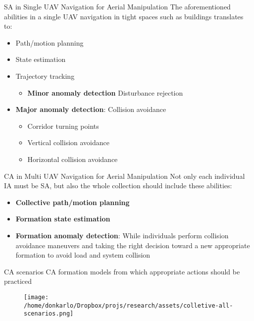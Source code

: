 \documentclass[unknownkeysallowed]{beamer}
\begin{document}
	\begin{frame}{SA in Single UAV Navigation for Aerial Manipulation}
		The aforementioned abilities in a single UAV navigation in tight spaces such as buildings translates to:
		\begin{itemize}
			\item Path/motion planning
			\item State estimation
			\item Trajectory tracking
				\begin{itemize}
					\item \textbf{Minor anomaly detection} Disturbance rejection
				\end{itemize}
			\item \textbf{Major anomaly detection}: Collision avoidance
				\begin{itemize}
					\item Corridor turning points
					\item Vertical collision avoidance
					\item Horizontal collision avoidance
				\end{itemize}
		\end{itemize}
	\end{frame}

	\begin{frame}{CA in Multi UAV Navigation for Aerial Manipulation}
		Not only each individual IA must be SA, but also the whole collection should include these abilities:
		\begin{itemize}
			\item \textbf{Collective path/motion planning}
			\item \textbf{Formation state estimation}
			\item \textbf{Formation anomaly detection}: While individuals perform collision avoidance maneuvers and taking the right decision toward a new appropriate formation to avoid load and system collision
		\end{itemize}
	\end{frame}

	\begin{frame}{CA scenarios}
		CA formation models from which appropriate actions should be practiced
		\begin{figure}
			\texttt{[image: /home/donkarlo/Dropbox/projs/research/assets/colletive-all-scenarios.png]}
			\caption{}
		\end{figure}
	\end{frame}
\end{document}

